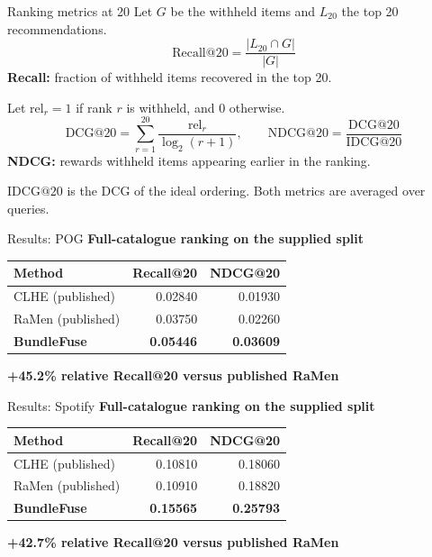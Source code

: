 \documentclass[11pt,aspectratio=169]{beamer}
\newcommand{\key}[1]{\textcolor{Accent}{\textbf{#1}}}
\begin{document}
\begin{frame}{Ranking metrics at 20}
Let $G$ be the withheld items and $L_{20}$ the top 20 recommendations.
\[
 \boxed{\mathrm{Recall@20}=\frac{|L_{20}\cap G|}{|G|}}
\]
\textbf{Recall:} fraction of withheld items recovered in the top 20.\par
\vspace{3mm}
Let $\mathrm{rel}_r=1$ if rank $r$ is withheld, and $0$ otherwise.
\[
 \mathrm{DCG@20}=\sum_{r=1}^{20}\frac{\mathrm{rel}_r}{\log_2(r+1)},
 \qquad
 \boxed{\mathrm{NDCG@20}=\frac{\mathrm{DCG@20}}{\mathrm{IDCG@20}}}
\]
\textbf{NDCG:} rewards withheld items appearing earlier in the ranking.\par
\vspace{2mm}
$\mathrm{IDCG@20}$ is the DCG of the ideal ordering. Both metrics are averaged over queries.
\end{frame}

\begin{frame}{Results: POG}
\textbf{Full-catalogue ranking on the supplied split}\par
\vspace{5mm}
\centering
\renewcommand{\arraystretch}{1.5}
\begin{tabular}{lrr}\toprule
Method & Recall@20 & NDCG@20\\\midrule
CLHE (published) & 0.02840 & 0.01930\\
RaMen (published) & 0.03750 & 0.02260\\
\key{BundleFuse} & \textbf{0.05446} & \textbf{0.03609}\\\bottomrule
\end{tabular}\par
\par\vspace{7mm}
\key{+45.2\% relative Recall@20 versus published RaMen}
\end{frame}

\begin{frame}{Results: Spotify}
\textbf{Full-catalogue ranking on the supplied split}\par
\vspace{5mm}
\centering
\renewcommand{\arraystretch}{1.5}
\begin{tabular}{lrr}\toprule
Method & Recall@20 & NDCG@20\\\midrule
CLHE (published) & 0.10810 & 0.18060\\
RaMen (published) & 0.10910 & 0.18820\\
\key{BundleFuse} & \textbf{0.15565} & \textbf{0.25793}\\\bottomrule
\end{tabular}\par
\par\vspace{7mm}
\key{+42.7\% relative Recall@20 versus published RaMen}
\end{frame}
\end{document}
